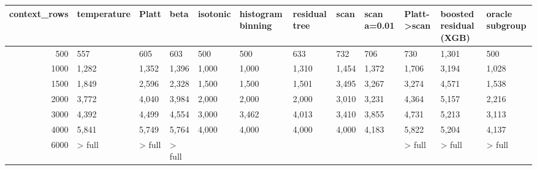 \begin{tabular}{rlllllllllll}
\toprule
context_rows & temperature & Platt & beta & isotonic & histogram binning & residual tree & scan & scan a=0.01 & Platt->scan & boosted residual (XGB) & oracle subgroup \\
\midrule
500 & 557 & 605 & 603 & 500 & 500 & 633 & 732 & 706 & 730 & 1,301 & 500 \\
1000 & 1,282 & 1,352 & 1,396 & 1,000 & 1,000 & 1,310 & 1,454 & 1,372 & 1,706 & 3,194 & 1,028 \\
1500 & 1,849 & 2,596 & 2,328 & 1,500 & 1,500 & 1,501 & 3,495 & 3,267 & 3,274 & 4,571 & 1,538 \\
2000 & 3,772 & 4,040 & 3,984 & 2,000 & 2,000 & 2,000 & 3,010 & 3,231 & 4,364 & 5,157 & 2,216 \\
3000 & 4,392 & 4,499 & 4,554 & 3,000 & 3,462 & 4,013 & 3,410 & 3,855 & 4,731 & 5,213 & 3,113 \\
4000 & 5,841 & 5,749 & 5,764 & 4,000 & 4,000 & 4,000 & 4,000 & 4,183 & 5,822 & 5,204 & 4,137 \\
6000 & > full & > full & > full &  &  &  &  &  & > full & > full & > full \\
\bottomrule
\end{tabular}
